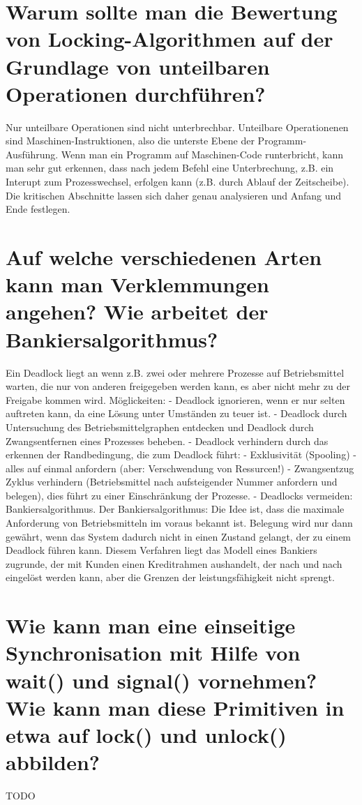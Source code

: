 \documentclass[12pt,a4paper,ngerman]{scrartcl}
\newcommand{\question}[1]{#1}
\newenvironment {answer}
                {}
                {}
\begin{document}
\section{\question{Warum sollte man die Bewertung von Locking-Algorithmen auf der Grundlage von unteilbaren Operationen durchführen?}}
\begin{answer}
Nur unteilbare Operationen sind nicht unterbrechbar.
Unteilbare Operationenen sind Maschinen-Instruktionen, also die unterste Ebene der Programm-
Ausführung. Wenn man ein Programm auf Maschinen-Code runterbricht, kann man sehr gut
erkennen, dass nach jedem Befehl eine Unterbrechung, z.B. ein Interupt zum Prozesswechsel,
erfolgen kann (z.B. durch Ablauf der Zeitscheibe). Die kritischen Abschnitte lassen sich daher
genau analysieren und Anfang und Ende festlegen.
\end{answer}

\section{\question{Auf welche verschiedenen Arten kann man Verklemmungen angehen? Wie arbeitet der Bankiersalgorithmus?}}
\begin{answer}
Ein Deadlock liegt an wenn z.B. zwei oder mehrere Prozesse auf Betriebsmittel warten, die nur
von anderen freigegeben werden kann, es aber nicht mehr zu der Freigabe kommen wird.
Möglickeiten:
- Deadlock ignorieren, wenn er nur selten auftreten kann, da eine Lösung unter Umständen zu
teuer ist.
- Deadlock durch Untersuchung des Betriebsmittelgraphen entdecken und Deadlock durch Zwangsentfernen
eines Prozesses beheben.
- Deadlock verhindern durch das erkennen der Randbedingung, die zum Deadlock führt:
- Exklusivität (Spooling)
- alles auf einmal anfordern (aber: Verschwendung von Ressurcen!)
- Zwangsentzug
Zyklus verhindern (Betriebsmittel nach aufsteigender Nummer anfordern und belegen), dies führt
zu einer Einschränkung der Prozesse.
- Deadlocks vermeiden: Bankiersalgorithmus.
Der Bankiersalgorithmus:
Die Idee ist, dass die maximale Anforderung von Betriebsmitteln im voraus bekannt ist. Belegung
wird nur dann gewährt, wenn das System dadurch nicht in einen Zustand gelangt, der zu einem
Deadlock führen kann. Diesem Verfahren liegt das Modell eines Bankiers zugrunde, der mit Kunden
einen Kreditrahmen aushandelt, der nach und nach eingelöst werden kann, aber die Grenzen der
leistungsfähigkeit nicht sprengt.
\end{answer}

\section{\question{Wie kann man eine einseitige Synchronisation mit Hilfe von wait() und signal() vornehmen? Wie kann man diese Primitiven in etwa auf lock() und unlock() abbilden?}}
\begin{answer}
TODO
\end{answer}
\end{document}
